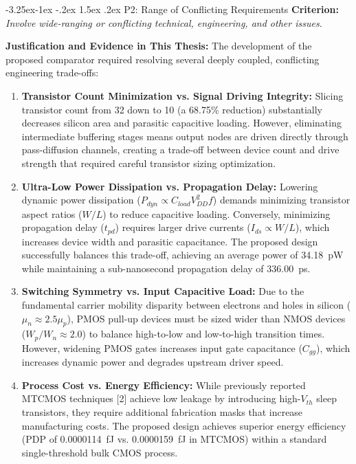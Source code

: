 \documentclass[12pt,a4paper,oneside]{report}
\makeatletter
\renewcommand\subsubsection{\@startsection{subsubsection}{3}{\z@}%
                                     {-3.25ex\@plus -1ex \@minus -.2ex}%
                                     {1.5ex \@plus .2ex}%
                                     {\normalfont\normalsize\itshape}}
\makeatother
\begin{document}
\subsubsection{P2: Range of Conflicting Requirements}
\textbf{Criterion:} \textit{Involve wide-ranging or conflicting technical, engineering, and other issues.}

\noindent\textbf{Justification and Evidence in This Thesis:}
The development of the proposed comparator required resolving several deeply coupled, conflicting engineering trade-offs:
\begin{enumerate}
\item \textbf{Transistor Count Minimization vs. Signal Driving Integrity:} Slicing transistor count from 32 down to 10 (a 68.75\% reduction) substantially decreases silicon area and parasitic capacitive loading. However, eliminating intermediate buffering stages means output nodes are driven directly through pass-diffusion channels, creating a trade-off between device count and drive strength that required careful transistor sizing optimization.
\item \textbf{Ultra-Low Power Dissipation vs. Propagation Delay:} Lowering dynamic power dissipation ($P_{dyn} \propto C_{load} V_{DD}^2 f$) demands minimizing transistor aspect ratios ($W/L$) to reduce capacitive loading. Conversely, minimizing propagation delay ($t_{pd}$) requires larger drive currents ($I_{ds} \propto W/L$), which increases device width and parasitic capacitance. The proposed design successfully balances this trade-off, achieving an average power of 34.18~pW while maintaining a sub-nanosecond propagation delay of 336.00~ps.
\item \textbf{Switching Symmetry vs. Input Capacitive Load:} Due to the fundamental carrier mobility disparity between electrons and holes in silicon ($\mu_n \approx 2.5\mu_p$), PMOS pull-up devices must be sized wider than NMOS devices ($W_p/W_n \approx 2.0$) to balance high-to-low and low-to-high transition times. However, widening PMOS gates increases input gate capacitance ($C_{gg}$), which increases dynamic power and degrades upstream driver speed.
\item \textbf{Process Cost vs. Energy Efficiency:} While previously reported MTCMOS techniques [2] achieve low leakage by introducing high-$V_{th}$ sleep transistors, they require additional fabrication masks that increase manufacturing costs. The proposed design achieves superior energy efficiency (PDP of 0.0000114~fJ vs. 0.0000159~fJ in MTCMOS) within a standard single-threshold bulk CMOS process.
\end{enumerate}
\end{document}
